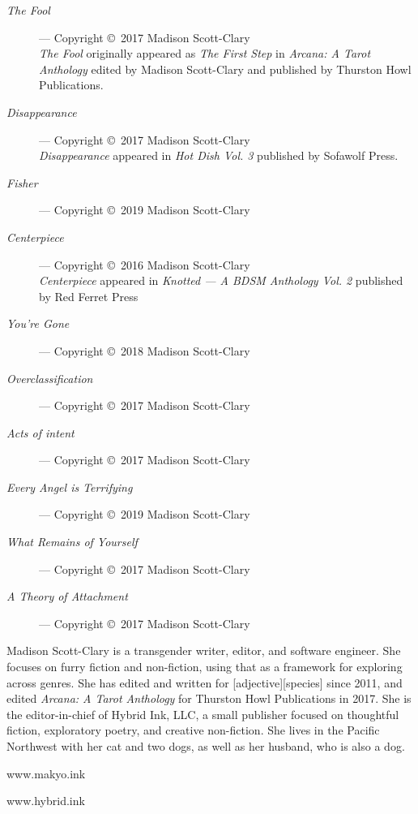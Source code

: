 \begin{description}
    \item[\emph{The Fool}]
    --- Copyright \copyright\ 2017 Madison Scott-Clary\\
    \emph{The Fool} originally appeared as \emph{The First Step} in \emph{Arcana: A Tarot Anthology} edited by Madison Scott-Clary and published by Thurston Howl Publications.
    \item[\emph{Disappearance}]
    --- Copyright \copyright\ 2017 Madison Scott-Clary\\
    \emph{Disappearance} appeared in \emph{Hot Dish Vol. 3} published by Sofawolf Press.
    \item[\emph{Fisher}]
    --- Copyright \copyright\ 2019 Madison Scott-Clary
    \item[\emph{Centerpiece}]
    --- Copyright \copyright\ 2016 Madison Scott-Clary\\
    \emph{Centerpiece} appeared in \emph{Knotted --- A BDSM Anthology Vol. 2} published by Red Ferret Press
    \item[\emph{You're Gone}]
    --- Copyright \copyright\ 2018 Madison Scott-Clary
    \item[\emph{Overclassification}]
    --- Copyright \copyright\ 2017 Madison Scott-Clary
    \item[\emph{Acts of intent}]
    --- Copyright \copyright\ 2017 Madison Scott-Clary
    \item[\emph{Every Angel is Terrifying}]
    --- Copyright \copyright\ 2019 Madison Scott-Clary
    \item[\emph{What Remains of Yourself}]
    --- Copyright \copyright\ 2017 Madison Scott-Clary
    \item[\emph{A Theory of Attachment}]
    --- Copyright \copyright\ 2017 Madison Scott-Clary
\end{description}
\newpage
\thispagestyle{empty}
\null
\vfill

\noindent Madison Scott-Clary is a transgender writer, editor, and software engineer. She focuses on furry fiction and non-fiction, using that as a framework for exploring across genres. She has edited and written for [adjective][species] since 2011, and edited \emph{Arcana: A Tarot Anthology} for Thurston Howl Publications in 2017. She is the editor-in-chief of Hybrid Ink, LLC, a small publisher focused on thoughtful fiction, exploratory poetry, and creative non-fiction. She lives in the Pacific Northwest with her cat and two dogs, as well as her husband, who is also a dog.

\begin{center}
    www.makyo.ink

    www.hybrid.ink
\end{center}

\vfill
